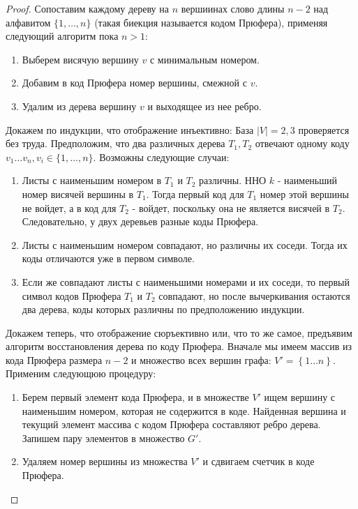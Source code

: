 \begin{proof}
	Сопоставим каждому дереву на $n$ вершиинах слово длины $n-2$ над алфавитом $\{1, \ldots, n\}$ (такая биекция называется кодом Прюфера), применяя следующий алгоритм пока $n > 1$:
	\begin{enumerate}
		\item Выберем висячую вершину $v$ с минимальным номером.
		\item Добавим в код Прюфера номер вершины, смежной с $v$.
		\item Удалим из дерева вершину $v$ и выходящее из нее ребро.
	\end{enumerate}

	
	Докажем по индукции, что отображение инъективно:
	База $|V|=2,3$ проверяется без труда. Предположим, что два различных дерева $T_{1}, T_{2}$ отвечают одному коду $v_{1} \ldots v_{n}, v_{i} \in\{1, \ldots, n\} .$
	Возможны следующие случаи:
	
	\begin{enumerate}
		\item Листы с наименьшим номером в $T_{1}$ и $T_{2}$ различны.
		ННО $k$ - наименьший номер висячей вершины  в $T_1$. Тогда первый код для $T_1$ номер этой вершины не войдет, а в код для $T_2$ - войдет, поскольку она не является висячей в $T_2$. Следовательно, у двух деревьев разные коды Прюфера.
		\item Листы с наименьшим номером совпадают, но различны их соседи. Тогда их коды отличаются уже в первом символе.
		\item Если же совпадают листы с наименьшими номерами и их соседи, то первый символ кодов Прюфера $T_1$ и $T_2$ совпадают, но после вычеркивания остаются два дерева, коды которых различны по предположению
		индукции.
	\end{enumerate}

	Докажем теперь, что отображение сюръективно или, что то же самое, предъявим алгоритм восстановления дерева по коду Прюфера.
	Вначале мы имеем массив из кода Прюфера размера $n-2$ и множество всех вершин графа: $ V' = \left\lbrace 1… n\right\rbrace $. Применим следующюю процедуру:
	
	 \begin{enumerate} 
	 	\item Берем первый элемент кода Прюфера, и в множестве $V'$ ищем вершину с наименьшим номером, которая не содержится в коде. Найденная вершина и текущий элемент массива с кодом Прюфера составляют ребро дерева. Запишем пару элементов в множество $G'$.
	 	\item Удаляем номер вершины из множества $V'$ и сдвигаем счетчик в коде Прюфера.
	\end{enumerate}


\end{proof}
